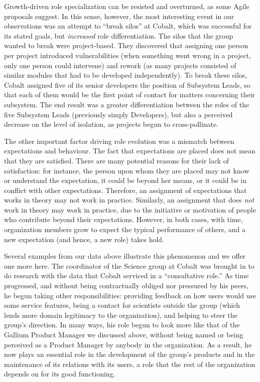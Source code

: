 \documentclass[10pt, conference, compsocconf]{IEEEtran}
\begin{document}
Growth-driven role specialization can be resisted and overturned, as some Agile proposals suggest. In this sense, however, the most interesting event in our observations was an attempt to ``break silos'' at Cobalt, which was successful for its stated goals, but \emph{increased} role differentiation. The silos that the group wanted to break were project-based. They discovered that assigning one person per project introduced vulnerabilities (when something went wrong in a project, only one person could intervene) and rework (as many projects consisted of similar modules that had to be developed independently). To break these silos, Cobalt assigned five of its senior developers the position of Subsystem Leads, so that each of them would be the first point of contact for matters concerning their subsystem. The end result was a greater differentiation between the roles of the five Subsystem Leads (previously simply Developers), but also a perceived decrease on the level of isolation, as projects begun to cross-pollinate.

The other important factor driving role evolution was a mismatch between expectations and behaviour. The fact that expectations are placed does not mean that they are satisfied. There are many potential reasons for their lack of satisfaction: for instance, the person upon whom they are placed may not know or understand the expectation, it could be beyond her means, or it could be in conflict with other expectations. Therefore, an assignment of expectations that works in theory may not work in practice. Similarly, an assignment that does \emph{not} work in theory may work in practice, due to the initiative or motivation of people who contribute beyond their expectations. However, in both cases, with time, organization members grow to expect the typical performance of others, and a new expectation (and hence, a new role) takes hold.

Several examples from our data above illustrate this phenomenon and we offer one more here. The coordinator of the Science group at Cobalt was brought in to do research with the data that Cobalt serviced in a ``consultative role.'' As time progressed, and without being contractually obliged nor pressured by his peers, he begun taking other responsibilities: providing feedback on how users would use some service features, being a contact for scientists outside the group (which lends more domain legitimacy to the organization), and helping to steer the group's direction. In many ways, his role begun to look more like that of the Gallium Product Manager we discussed above, without being named or being perceived as a Product Manager by anybody in the organization. As a result, he now plays an essential role in the development of the group's products and in the maintenance of its relations with its users, a role that the rest of the organization depends on for its good functioning.
\end{document}
